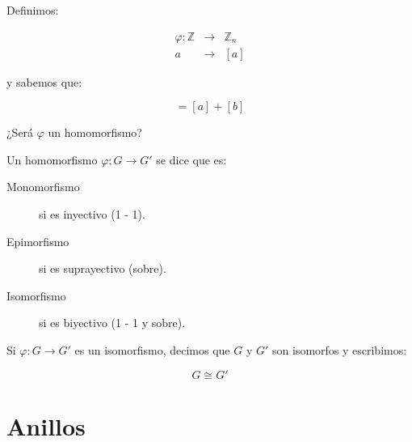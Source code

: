         \begin{ejercicio}
            Definimos:

            \begin{eqnarray*}
                \varphi \colon \mathbb{Z} & \to & \mathbb{Z}_n \\
                a & \to & [a]
            \end{eqnarray*}

            y sabemos que:

            \begin{equation*}
                [a + b] = [a] + [b]
            \end{equation*}

            ¿Será $\varphi$ un homomorfismo?
        \end{ejercicio}

        \begin{definicion}
            Un homomorfismo $\varphi \colon G \to G'$ se dice que es:

            \begin{description}
                \item[Monomorfismo] si es inyectivo (1 - 1).
                \item[Epimorfismo] si es suprayectivo (sobre).
                \item[Isomorfismo] si es biyectivo (1 - 1 y sobre).
            \end{description}
        \end{definicion}

        \begin{definicion}
            Si $\varphi \colon G \to G'$ es un isomorfismo, decimos que $G$ y $G'$ son isomorfos y escribimos:

            \begin{equation}
                G \cong G'
            \end{equation}
        \end{definicion}


\newpage
\section{Anillos}


